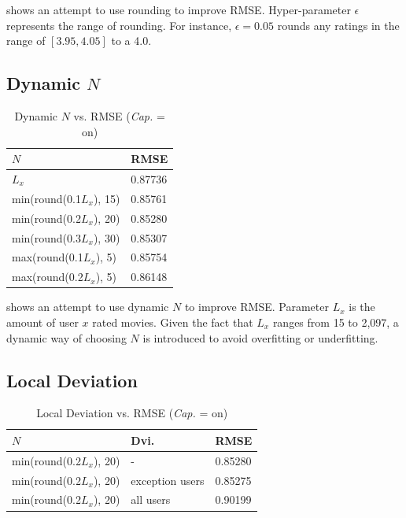 \documentclass{ece}
\begin{document}
 shows an attempt to use rounding to improve RMSE. 
Hyper-parameter $\epsilon$ represents the range of rounding. For instance, $\epsilon=0.05$ rounds any ratings in the range of $[3.95, 4.05]$ to a 4.0.

\subsection{Dynamic $N$}

\begin{table}[h]
    \caption[Dynamic $N$ vs. RMSE]{Dynamic $N$ vs. RMSE (\textit{Cap.} = on)}
    \label{tab:table-4}
    \centering
\begin{tabular}{|l|l|}
\hline
\textbf{$N$}             & \textbf{RMSE}    \\ \hline
$L_x$                    & 0.87736 \\ \hline
min(round(0.1$L_x$), 15) & 0.85761 \\ \hline
min(round(0.2$L_x$), 20) & 0.85280 \\ \hline
min(round(0.3$L_x$), 30) & 0.85307 \\ \hline
max(round(0.1$L_x$), 5)  & 0.85754 \\ \hline
max(round(0.2$L_x$), 5)  & 0.86148 \\ \hline
\end{tabular}
\end{table}

 shows an attempt to use dynamic $N$ to improve RMSE.
Parameter $L_x$ is the amount of user $x$ rated movies.
Given the fact that $L_x$ ranges from 15 to 2,097, a dynamic way of choosing $N$ is introduced to avoid overfitting or underfitting.

\subsection{Local Deviation}

\begin{table}[h]
    \caption[Local Deviation vs. RMSE]{Local Deviation vs. RMSE (\textit{Cap.} = on)}
    \label{tab:table-5}
    \centering
\begin{tabular}{|l|l|l|}
\hline
\textbf{$N$}             & \textbf{Dvi.}   & \textbf{RMSE}    \\ \hline
min(round(0.2$L_x$), 20) & -               & 0.85280 \\ \hline
min(round(0.2$L_x$), 20) & exception users & 0.85275 \\ \hline
min(round(0.2$L_x$), 20) & all users       & 0.90199 \\ \hline
\end{tabular}
\end{table}
\end{document}
